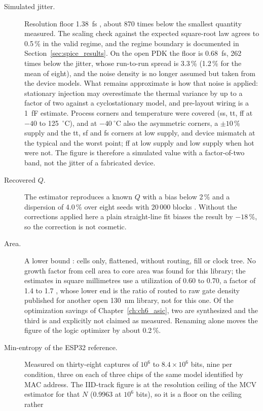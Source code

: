 \begin{description}
\item[Simulated jitter.] Resolution floor 1.38~fs \simu{}, about 870 times
below the smallest quantity measured. The scaling check against the
expected square-root law agrees to 0.5\,\% in the valid regime, and the
regime boundary is documented in Section~\ref{sec:spice_results}. On the
open \ac{PDK} the floor is 0.68~fs, 262 times below the jitter, whose
run-to-run spread is 3.3\,\% (1.2\,\% for the mean of eight), and the
noise density is no longer assumed but taken from the device models.
What remains approximate is how that noise is applied: stationary
injection may overestimate the thermal variance by up to a factor of two
against a cyclostationary model, and pre-layout wiring is a 1~fF
estimate. Process corners and temperature were covered (ss, tt, ff at
$-40$ to 125~$^\circ$C), and at $-40~^\circ$C also the asymmetric
corners, a $\pm10$\,\% supply and the tt, sf and fs corners at low
supply, and device mismatch at the typical and the worst point; ff at
low supply and low supply when hot were not. The figure is therefore a simulated value with a
factor-of-two band, not the jitter of a fabricated device.
\item[Recovered $Q$.] The estimator reproduces a known $Q$ with a bias
below 2\,\% and a dispersion of 4.0\,\% over eight seeds with 20\,000
blocks \simu{}. Without the corrections applied here a plain straight-line
fit biases the result by $-18$\,\%, so the correction is not cosmetic.
\item[Area.] A lower bound \simu{}: cells only, flattened, without routing,
fill or clock tree. No growth factor from cell area to core area was
found for this library; the estimates in square millimetres use a
utilization of 0.60 to 0.70, a factor of 1.4 to 1.7 \est{}, whose lower
end is the ratio of routed to raw gate density published for another
open 130~nm library, not for this one. Of the optimization
savings of Chapter~\ref{ch:ch6_asic}, two are synthesized and the third
is \est{} and explicitly not claimed as measured. Renaming alone moves
the figure of the logic optimizer by about 0.2\,\%.
\item[Min-entropy of the ESP32 reference.] Measured \meas{} on thirty-eight
captures of $10^6$ to $8.4\times10^6$ bits, nine per condition, three on
each of three chips of the same model identified by MAC address. The
IID-track figure is at the resolution ceiling of the MCV estimator for
that $N$ (0.9963 at $10^6$ bits), so it is a floor on the ceiling rather

\end{description}
